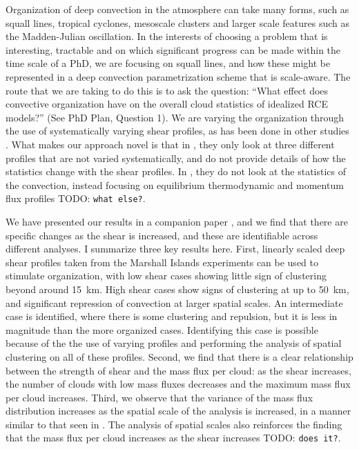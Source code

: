\documentclass[11pt,a4paper]{article}
\newcommand{\todo}{TODO: \texttt}
\begin{document}
Organization of deep convection in the atmosphere can take many forms, such as squall lines, tropical cyclones, mesoscale clusters and larger scale features such as the Madden-Julian oscillation. In the interests of choosing a problem that is interesting, tractable and on which significant progress can be made within the time scale of a PhD, we are focusing on squall lines, and how these might be represented in a deep convection parametrization scheme that is scale-aware. The route that we are taking to do this is to ask the question: ``What effect does convective organization have on the overall cloud statistics of idealized RCE models?'' (See PhD Plan, Question 1). We are varying the organization through the use of systematically varying shear profiles, as has been done in other studies . What makes our approach novel is that in \cite{CC2006II}, they only look at three different profiles that are not varied systematically, and do not provide details of how the statistics change with the shear profiles. In \cite{RE2001}, they do not look at the statistics of the convection, instead focusing on equilibrium thermodynamic and momentum flux profiles \todo{what else?}. 

We have presented our results in a companion paper \parencite{muetz2017effects}, and we find that there are specific changes as the shear is increased, and these are identifiable across different analyses. I summarize three key results here. First, linearly scaled deep shear profiles taken from the Marshall Islands experiments \cite{yanai} can be used to stimulate organization, with low shear cases showing little sign of clustering beyond around \SI{15}{km}. High shear cases show signs of clustering at up to \SI{50}{km}, and significant repression of convection at larger spatial scales. An intermediate case is identified, where there is some clustering and repulsion, but it is less in magnitude than the more organized cases. Identifying this case is possible because of the the use of varying profiles and performing the analysis of spatial clustering on all of these profiles. Second, we find that there is a clear relationship between the strength of shear and the mass flux per cloud: as the shear increases, the number of clouds with low mass fluxes decreases and the maximum mass flux per cloud increases. Third, we observe that the variance of the mass flux distribution increases as the spatial scale of the analysis is increased, in a manner similar to that seen in \cite{plant2008stochastic}. The analysis of spatial scales also reinforces the finding that the mass flux per cloud increases as the shear increases \todo{does it?}.
\end{document}
